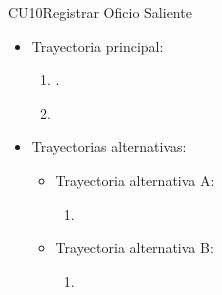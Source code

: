 \newpage
\begin{UseCase}{CU10}{Registrar Oficio Saliente}{}
	\UCitem{}{}
\end{UseCase}

\begin{itemize}	
	\item Trayectoria principal:
		\begin{enumerate}
			\item {}.
			\item 
		\end{enumerate}
	\item Trayectorias alternativas:
		\begin{itemize}
			\item Trayectoria alternativa A: 
				\begin{enumerate}
					\item 
				\end{enumerate}
			\item Trayectoria alternativa B: 
				\begin{enumerate}
					\item 
				\end{enumerate}
		\end{itemize}
\end{itemize}

\newpage